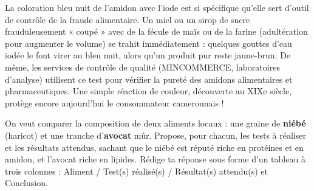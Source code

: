 \documentclass[11pt]{article}
\begin{document}
\begin{savaistu}
La coloration bleu nuit de l'amidon avec l'iode est si spécifique qu'elle sert d'outil de contrôle de la fraude alimentaire. Un miel ou un sirop de sucre frauduleusement « coupé » avec de la fécule de maïs ou de la farine (adultération pour augmenter le volume) se trahit immédiatement : quelques gouttes d'eau iodée le font virer au bleu nuit, alors qu'un produit pur reste jaune-brun. De même, les services de contrôle de qualité (MINCOMMERCE, laboratoires d'analyse) utilisent ce test pour vérifier la pureté des amidons alimentaires et pharmaceutiques. Une simple réaction de couleur, découverte au XIXe siècle, protège encore aujourd'hui le consommateur camerounais !
\end{savaistu}

\begin{exercice}
On veut comparer la composition de deux aliments locaux : une graine de \textbf{niébé} (haricot) et une tranche d'\textbf{avocat} mûr. Propose, pour chacun, les tests à réaliser et les résultats attendus, sachant que le niébé est réputé riche en protéines et en amidon, et l'avocat riche en lipides. Rédige ta réponse sous forme d'un tableau à trois colonnes : Aliment / Test(s) réalisé(s) / Résultat(s) attendu(s) et Conclusion.
\end{exercice}
\end{document}
